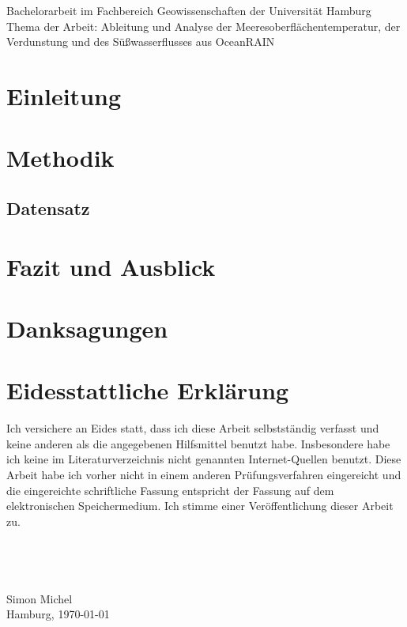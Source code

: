 \documentclass[11pt,twoside,a4paper,fleqn]{report}
\numberwithin{equation}{chapter}
\numberwithin{figure}{chapter}
\numberwithin{table}{chapter}
\begin{document}
	\newpage
	\thispagestyle{empty}
	\null
	\vfill
	Bachelorarbeit im Fachbereich Geowissenschaften der Universität Hamburg\\
	Thema der Arbeit: \glqq Ableitung und Analyse der Meeresoberflächentemperatur, der Verdunstung und des Süßwasserflusses aus OceanRAIN\grqq
	
	
\newpage
\renewcommand{\abstractname}{\huge \flushleft Zusammenfassung}
\begin{abstract}
\null
\end{abstract}
\thispagestyle{empty}
\pagestyle{empty}
\tableofcontents
\listoffigures
\listoftables
\newpage\pagestyle{fancy}
\chapter{Einleitung}
\chapter{Methodik}
\section{Datensatz}
\chapter{Fazit und Ausblick}
\chapter{Danksagungen}

\chapter{Eidesstattliche Erklärung}
Ich versichere an Eides statt, dass ich diese Arbeit selbstständig verfasst und keine anderen als die angegebenen Hilfsmittel benutzt habe. Insbesondere habe ich keine im Literaturverzeichnis nicht genannten Internet-Quellen benutzt. Diese Arbeit habe ich vorher nicht in einem anderen Prüfungsverfahren eingereicht und die eingereichte schriftliche Fassung entspricht der Fassung auf dem elektronischen Speichermedium. Ich stimme einer Veröffentlichung dieser Arbeit zu.
\\
\\
\\
\\
\\
Simon Michel\\
Hamburg, \today
\end{document}
